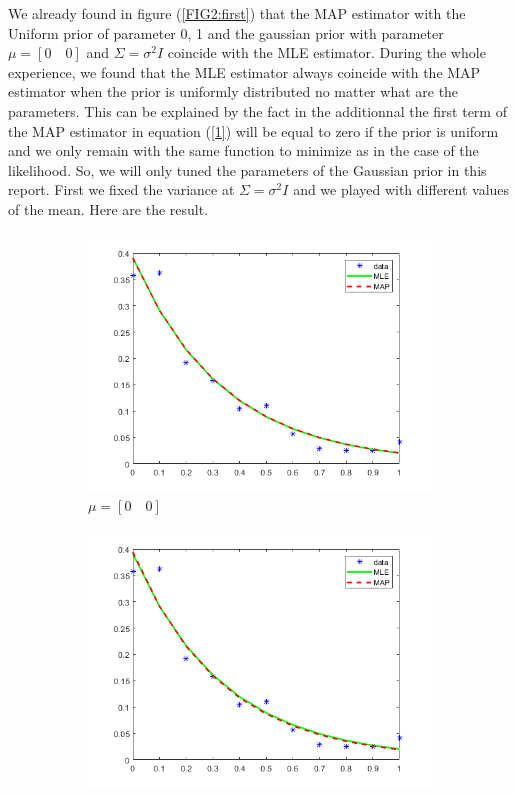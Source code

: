 \documentclass[11pt,a4paper]{article}
\begin{document}
\begin{enumerate}
\begin{itemize}
We already found in figure (\ref{FIG2:first}) that the MAP estimator with the Uniform prior of parameter 0, 1 and the gaussian prior with parameter $ \mu = [0\quad 0] $ and $ \Sigma = \sigma^2I $ coincide with the MLE estimator. During the whole experience, we found that the MLE estimator always coincide with the MAP estimator when the prior is uniformly distributed no matter what are the parameters. This can be explained by the fact in the additionnal the first term of the MAP estimator in equation (\ref{1}) will be equal to zero if the prior is uniform and we only remain with the same function to minimize as in the case of the likelihood. So, we will only tuned the parameters of the Gaussian prior in this report. First we fixed the variance at $ \Sigma = \sigma^2 I $ and we played with different values of the mean. Here are the result.
\begin{figure}[H]
	\centering
	\begin{subfigure}{0.4\textwidth}
		\includegraphics[width=\textwidth]{fig5}
			\caption{$ \mu  = [0\quad0]$}
		\label{fig4:first}
	\end{subfigure}
	\begin{subfigure}{0.4\textwidth}
		\includegraphics[width=\textwidth]{fig6}

\end{subfigure}
\end{figure}
\end{itemize}
\end{enumerate}
\end{document}
